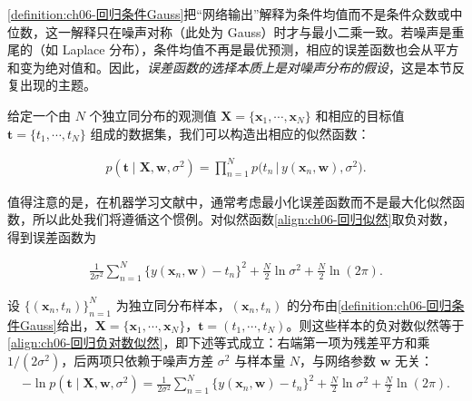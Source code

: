 \documentclass[../../main.tex]{subfiles}
\begin{document}
\begin{remark}\cref{definition:ch06-回归条件Gauss}把“网络输出”解释为条件均值而不是条件众数或中位数，这一解释只在噪声对称（此处为 Gauss）时才与最小二乘一致。若噪声是重尾的（如 Laplace 分布），条件均值不再是最优预测，相应的误差函数也会从平方和变为绝对值和。因此，\emph{误差函数的选择本质上是对噪声分布的假设}，这是本节反复出现的主题。
\end{remark}

给定一个由 $N$ 个独立同分布的观测值 $\boldsymbol{X}=\{\boldsymbol{x}_1,\cdots,\boldsymbol{x}_N\}$ 和相应的目标值 $\boldsymbol{t}=\{t_1,\cdots,t_N\}$ 组成的数据集，我们可以构造出相应的似然函数：

\begin{align}
p(\boldsymbol{t}\mid\boldsymbol{X},\boldsymbol{w},\sigma^{2})=\prod_{n=1}^{N}p\bigl(t_n\,\big|\,y(\boldsymbol{x}_n,\boldsymbol{w}),\sigma^{2}\bigr).
\label{align:ch06-回归似然}
\end{align}

值得注意的是，在机器学习文献中，通常考虑最小化误差函数而不是最大化似然函数，所以此处我们将遵循这个惯例。对似然函数\eqref{align:ch06-回归似然}取负对数，得到误差函数为

\begin{align}
\frac{1}{2\sigma^{2}}\sum_{n=1}^{N}\bigl\{y(\boldsymbol{x}_n,\boldsymbol{w})-t_n\bigr\}^{2}+\frac{N}{2}\ln\sigma^{2}+\frac{N}{2}\ln(2\pi).
\label{align:ch06-回归负对数似然}
\end{align}

\begin{proposition}[回归的负对数似然]\label{proposition:ch06-回归负对数似然}
设 $\{(\boldsymbol{x}_{n},t_{n})\}_{n=1}^{N}$ 为独立同分布样本，$(\boldsymbol{x}_{n},t_{n})$ 的分布由\cref{definition:ch06-回归条件Gauss}给出，$\boldsymbol{X}=\{\boldsymbol{x}_{1},\cdots,\boldsymbol{x}_{N}\}$，$\boldsymbol{t}=(t_{1},\cdots,t_{N})$。则这些样本的负对数似然等于\eqref{align:ch06-回归负对数似然}，即下述等式成立：右端第一项为残差平方和乘 $1/(2\sigma^{2})$，后两项只依赖于噪声方差 $\sigma^{2}$ 与样本量 $N$，与网络参数 $\boldsymbol{w}$ 无关：
\begin{align}
-\ln p(\boldsymbol{t}\mid\boldsymbol{X},\boldsymbol{w},\sigma^{2})
=\frac{1}{2\sigma^{2}}\sum_{n=1}^{N}\bigl\{y(\boldsymbol{x}_n,\boldsymbol{w})-t_n\bigr\}^{2}+\frac{N}{2}\ln\sigma^{2}+\frac{N}{2}\ln(2\pi).
\label{align:ch06-回归负对数展开}
\end{align}
\end{proposition}
\end{document}
